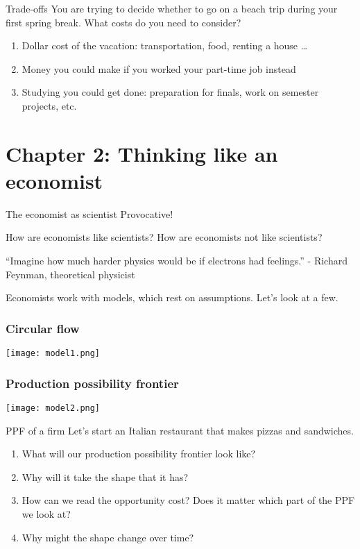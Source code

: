 \documentclass[aspectratio=169]{beamer}
\begin{document}
\begin{frame}{Trade-offs}
    You are trying to decide whether to go on a beach trip during your first spring break. What costs do you need to consider? 

    \medskip

    \begin{enumerate}
        \item Dollar cost of the vacation: transportation, food, renting a house \dots
        \item Money you could make if you worked your part-time job instead
        \item Studying you could get done: preparation for finals, work on semester projects, etc.
    \end{enumerate}
\end{frame}

\section{Chapter 2: Thinking like an economist}

\begin{frame}{The economist as scientist}
    Provocative! 

    \medskip

    How are economists like scientists? 
    How are economists not like scientists?

    \medskip

    \begin{block}{“Imagine how much harder physics would be if electrons had feelings.”}
        - Richard Feynman, theoretical physicist
    \end{block}

    \medskip

    Economists work with models, which rest on assumptions. Let's look at a few.
\end{frame}

\begin{frame}
    \frametitle{Circular flow}
    \centering
    \texttt{[image: model1.png]}
\end{frame}

\begin{frame}
    \frametitle{Production possibility frontier}
    \centering
    \texttt{[image: model2.png]}
\end{frame}

\begin{frame}{PPF of a firm}
    Let's start an Italian restaurant that makes pizzas and sandwiches.
    \begin{enumerate}
        \item What will our production possibility frontier look like?
        \item Why will it take the shape that it has?
        \item How can we read the opportunity cost? Does it matter which part of the PPF we look at?
        \item Why might the shape change over time?
    \end{enumerate}
\end{frame}
\end{document}

